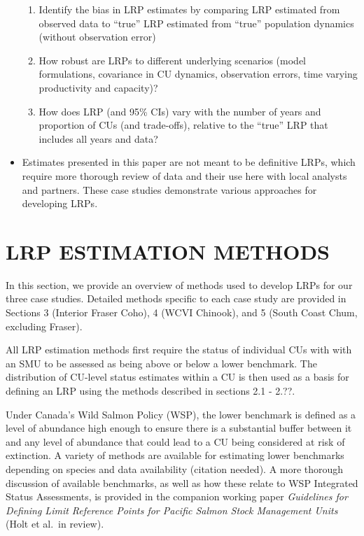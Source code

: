 \documentclass[11pt]{book}
\begin{document}
\begin{itemize}
\begin{enumerate}
  \item
    Identify the bias in LRP estimates by comparing LRP estimated from observed data to ``true'' LRP estimated from ``true'' population dynamics (without observation error)
  \item
    How robust are LRPs to different underlying scenarios (model formulations, covariance in CU dynamics, observation errors, time varying productivity and capacity)?
  \item
    How does LRP (and 95\% CIs) vary with the number of years and proportion of CUs (and trade-offs), relative to the ``true'' LRP that includes all years and data?
  \end{enumerate}
\item
  Estimates presented in this paper are not meant to be definitive LRPs, which require more thorough review of data and their use here with local analysts and partners. These case studies demonstrate various approaches for developing LRPs.
\end{itemize}
\hypertarget{lrp-estimation-methods}{%
\section{LRP ESTIMATION METHODS}\label{lrp-estimation-methods}}

In this section, we provide an overview of methods used to develop LRPs for our three case studies. Detailed methods specific to each case study are provided in Sections 3 (Interior Fraser Coho), 4 (WCVI Chinook), and 5 (South Coast Chum, excluding Fraser).

All LRP estimation methods first require the status of individual CUs with with an SMU to be assessed as being above or below a lower benchmark. The distribution of CU-level status estimates within a CU is then used as a basis for defining an LRP using the methods described in sections 2.1 - 2.??.

Under Canada's Wild Salmon Policy (WSP), the lower benchmark is defined as a level of abundance high enough to ensure there is a substantial buffer between it and any level of abundance that could lead to a CU being considered at risk of extinction. A variety of methods are available for estimating lower benchmarks depending on species and data availability (citation needed). A more thorough discussion of available benchmarks, as well as how these relate to WSP Integrated Status Assessments, is provided in the companion working paper \emph{Guidelines for Defining Limit Reference Points for Pacific Salmon Stock Management Units} (Holt et al.~in review).
\end{document}
